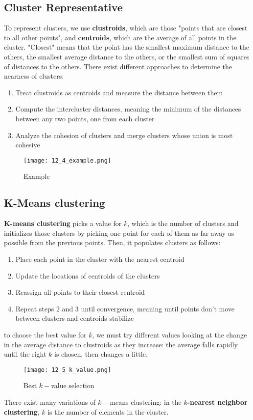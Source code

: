 \documentclass{article}
\begin{document}
\subsection{Cluster Representative}
To represent clusters, we use \textbf{clustroids}, which are those "points that are closest to all other points", and \textbf{centroids}, which are the average of all points in the cluster.
"Closest" means that the point has the smallest maximum distance to the others, the smallest average distance to the others, or the smallest sum of squares of distances to the others.
There exist different approaches to determine the nearness of clusters:
\begin{enumerate}
    \item Treat clustroids as centroids and measure the distance between them
    \item Compute the intercluster distances, meaning the minimum of the distances between any two points, one from each cluster
    \item Analyze the cohesion of clusters and merge clusters whose union is most cohesive
\end{enumerate}
\begin{figure}[H]
    \centering
    \texttt{[image: 12\_4\_example.png]}
    \caption{Example}
\end{figure}

\subsection{K-Means clustering}
\textbf{K-means clustering} picks a value for $k$, which is the number of clusters and initializes those clusters by picking one point for each of them as far away as possible from the previous points. Then, it populates clusters as follows:
\begin{enumerate}
    \item Place each point in the cluster with the nearest centroid
    \item Update the locations of centroids of the clusters
    \item Reassign all points to their closest centroid
    \item Repeat steps 2 and 3 until convergence, meaning until points don’t move between clusters and centroids stabilize
\end{enumerate}
to choose the best value for $k$, we must try different values looking at the change in the average distance to clustroids as they increase: the average falls rapidly until the right $k$ is chosen, then changes a little. 
\begin{figure}[H]
    \centering
    \texttt{[image: 12\_5\_k\_value.png]}
    \caption{Best $k-$value selection}
\end{figure}
There exist many variations of $k-$means clustering: in the \textbf{$k$-nearest neighbor clustering}, $k$ is the number of elements in the cluster.
\end{document}
